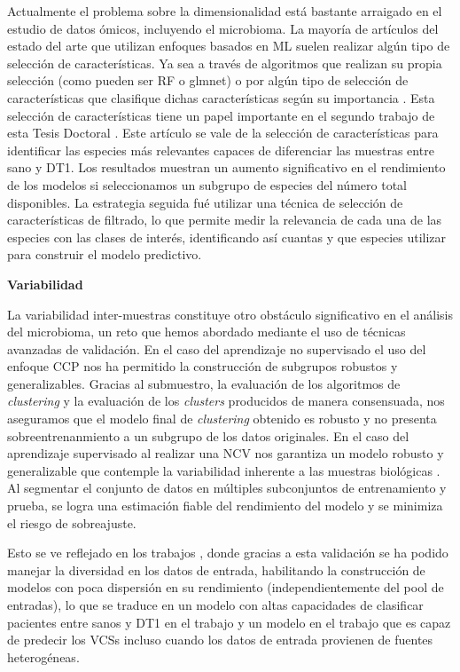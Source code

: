 Actualmente el problema sobre la dimensionalidad está bastante arraigado en el estudio de datos ómicos, incluyendo el microbioma. La mayoría de artículos del estado del arte que utilizan enfoques basados en ML suelen realizar algún tipo de selección de características. Ya sea a través de algoritmos que realizan su propia selección (como pueden ser RF o glmnet) o por algún tipo de selección de características que clasifique dichas características según su importancia \cite{beck2015machine, biassoni2020gut, bakir2021discovering, bakir2022inflammatory, chavarria2025using}. Esta selección de características tiene un papel importante en el segundo trabajo de esta Tesis Doctoral \cite{paper2}. Este artículo se vale de la selección de características para identificar las especies más relevantes capaces de diferenciar las muestras entre sano y DT1. Los resultados muestran un aumento significativo en el rendimiento de los modelos si seleccionamos un subgrupo de especies del número total disponibles. La estrategia seguida fué utilizar una técnica de selección de características de filtrado, lo que permite medir la relevancia de cada una de las especies con las clases de interés, identificando así cuantas y que especies utilizar para construir el modelo predictivo.


\textbf{Variabilidad}

La variabilidad inter-muestras constituye otro obstáculo significativo en el análisis del microbioma, un reto que hemos abordado mediante el uso de técnicas avanzadas de validación. En el caso del aprendizaje no supervisado el uso del enfoque CCP nos ha permitido la construcción de subgrupos robustos y generalizables. Gracias al submuestro, la evaluación de los algoritmos de \textit{clustering} y la evaluación de los \textit{clusters} producidos de manera consensuada, nos aseguramos que el modelo final de \textit{clustering} obtenido es robusto y no presenta sobreentrenanmiento a un subgrupo de los datos originales. En el caso del aprendizaje supervisado al realizar una NCV nos garantiza un modelo robusto y generalizable que contemple la variabilidad inherente a las muestras biológicas \cite{varma2006bias}. Al segmentar el conjunto de datos en múltiples subconjuntos de entrenamiento y prueba, se logra una estimación fiable del rendimiento del modelo y se minimiza el riesgo de sobreajuste. 

Esto se ve reflejado en los trabajos \cite{paper2, paper3}, donde gracias a esta validación se ha podido manejar la diversidad en los datos de entrada, habilitando la construcción de modelos con poca dispersión en su rendimiento (independientemente del pool de entradas), lo que se traduce en un modelo con altas capacidades de clasificar pacientes entre sanos y DT1 en el trabajo \cite{paper2} y un modelo en el trabajo \cite{paper3} que es capaz de predecir los VCSs incluso cuando los datos de entrada provienen de fuentes heterogéneas.

